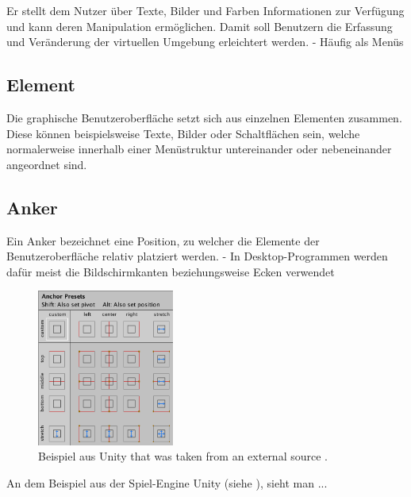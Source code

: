		Er stellt dem Nutzer über Texte, Bilder und Farben Informationen zur Verfügung und kann deren Manipulation ermöglichen. Damit soll Benutzern die Erfassung und Veränderung der virtuellen Umgebung erleichtert werden.
		- Häufig als Menüs
	
		\subsection{Element}
			Die graphische Benutzeroberfläche setzt sich aus einzelnen Elementen zusammen. Diese können beispielsweise Texte, Bilder oder Schaltflächen sein, welche normalerweise innerhalb einer Menüstruktur untereinander oder nebeneinander angeordnet sind.
	
		\subsection{Anker}
			Ein Anker bezeichnet eine Position, zu welcher die Elemente der Benutzeroberfläche relativ platziert werden.
			- In Desktop-Programmen werden dafür meist die Bildschirmkanten beziehungsweise Ecken verwendet
			\begin{figure}[htbp]
				\centering
				\includegraphics[width=0.4\textwidth]{figures/Ui_Anchor_Unity.png}
				\caption{Beispiel aus Unity that was taken from an external source .}
				\label{fig:unity}
			\end{figure}
			
			An dem Beispiel aus der Spiel-Engine Unity (siehe ), sieht man ... 
	
